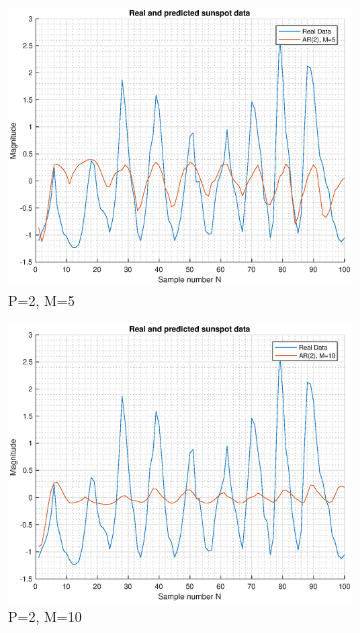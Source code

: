 \documentclass{article}
\begin{document}
\begin{figure}[h!]
\begin{subfigure}{0.24\textwidth}
\includegraphics[width = \textwidth]{ar_mod2_hor5}
\caption{P=2, M=5}
\label{fig:ar_mod2_hor5}
\end{subfigure}
\begin{subfigure}{0.24\textwidth}
\centering
\includegraphics[width = \textwidth]{ar_mod2_hor10}
\caption{P=2, M=10}
\label{fig:ar_mod2_hor10}
\end{subfigure}
\begin{subfigure}{0.24\textwidth}
\centering

\end{subfigure}
\end{figure}
\end{document}
